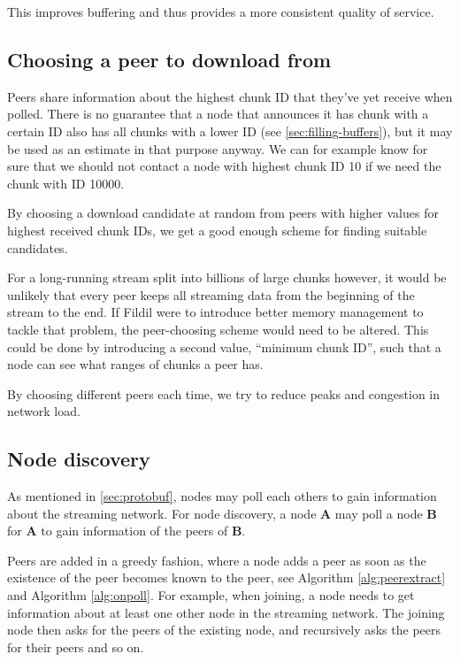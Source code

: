 \documentclass[10pt, a4paper]{article}
\begin{document}
This improves buffering and thus provides a more consistent quality of service.

\subsection{Choosing a peer to download from}
\label{sec:choosing-peers}

Peers share information about the highest chunk ID that they've yet receive when
polled. There is no guarantee that a node that announces it has chunk with a
certain ID also has all chunks with a lower ID (see
\autoref{sec:filling-buffers}), but it may be used as an estimate in that
purpose anyway. We can for example know for sure that we should not contact a
node with highest chunk ID 10 if we need the chunk with ID 10000.

By choosing a download candidate at random from peers with higher values for
highest received chunk IDs, we get a good enough scheme for finding suitable
candidates.

For a long-running stream split into billions of large chunks however, it would
be unlikely that every peer keeps all streaming data from the beginning of the
stream to the end. If Fildil were to introduce better memory management to
tackle that problem, the peer-choosing scheme would need to be altered. This
could be done by introducing a second value, ``minimum chunk ID'', such that a
node can see what ranges of chunks a peer has.

By choosing different peers each time, we try to reduce peaks and congestion in
network load.

\subsection{Node discovery}
\label{sec:node-discovery}

As mentioned in \autoref{sec:protobuf}, nodes may poll each others to
gain information about the streaming network. For node discovery, a
node \textbf{A} may poll a node \textbf{B} for \textbf{A} to gain
information of the peers of \textbf{B}.

Peers are added in a greedy fashion, where a node adds a peer as soon
as the existence of the peer becomes known to the peer, see Algorithm
\autoref{alg:peerextract} and Algorithm \autoref{alg:onpoll}. For
example, when joining, a node needs to get information about at least
one other node in the streaming network. The joining node then asks
for the peers of the existing node, and recursively asks the peers for
their peers and so on.
\end{document}
